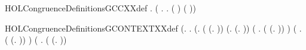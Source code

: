 \newcommand{\HOLCongruenceDefinitionsCONTEXTXXdef}{\UseVerbatim{HOLCongruenceDefinitionsCONTEXTXXdef}}
\begin{SaveVerbatim}{HOLCongruenceDefinitionsGCCXXdef}
\HOLTokenTurnstile{} \HOLSymConst{\HOLTokenForall{}}.   \HOLSymConst{=} (\HOLTokenLambda{} . \HOLSymConst{\HOLTokenForall{}}.   \HOLSymConst{\HOLTokenImp{}}  ( ) ( ))
\end{SaveVerbatim}
\newcommand{\HOLCongruenceDefinitionsGCCXXdef}{\UseVerbatim{HOLCongruenceDefinitionsGCCXXdef}}
\begin{SaveVerbatim}{HOLCongruenceDefinitionsGCONTEXTXXdef}
\HOLTokenTurnstile{}  \HOLSymConst{=}
   (\HOLTokenLambda{}.
        \HOLSymConst{\HOLTokenForall{}}.
            (\HOLSymConst{\HOLTokenForall{}}.
                 ( \HOLSymConst{=} (\HOLTokenLambda{}. )) \HOLSymConst{\HOLTokenDisj{}} (\HOLSymConst{\HOLTokenExists{}}.  \HOLSymConst{=} (\HOLTokenLambda{}. )) \HOLSymConst{\HOLTokenDisj{}}
                 (\HOLSymConst{\HOLTokenExists{}} . ( \HOLSymConst{=} (\HOLTokenLambda{}.  )) \HOLSymConst{\HOLTokenConj{}}  ) \HOLSymConst{\HOLTokenDisj{}}
                 (\HOLSymConst{\HOLTokenExists{}}   .
                      ( \HOLSymConst{=} (\HOLTokenLambda{}.   \HOLSymConst{\ensuremath{+}}  )) \HOLSymConst{\HOLTokenConj{}}
                        \HOLSymConst{\HOLTokenConj{}}  ) \HOLSymConst{\HOLTokenDisj{}}
                 (\HOLSymConst{\HOLTokenExists{}} .
                      ( \HOLSymConst{=} (\HOLTokenLambda{}.   \HOLSymConst{\ensuremath{\parallel}}  )) \HOLSymConst{\HOLTokenConj{}}   \HOLSymConst{\HOLTokenConj{}}

\end{SaveVerbatim}
